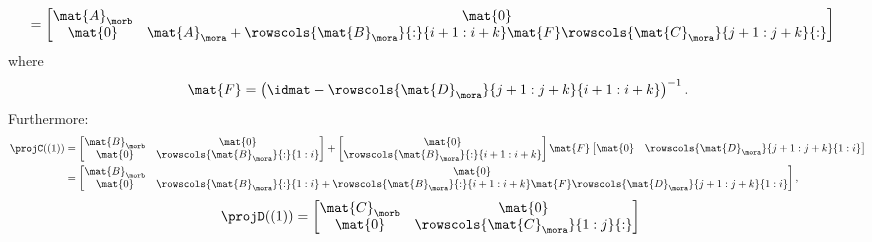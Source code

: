 \begin{example}
\begin{equation*}
\begin{aligned}
                        & =\begin{bmatrix}\mat{A}_\morb & \mat{0}                                                                                         \\
               \mat{0}       & \mat{A}_\mora + \rowscols{\mat{B}_\mora}{:}{i+1:i+k}\mat{F}\rowscols{\mat{C}_\mora}{j+1:j+k}{:}
                           \end{bmatrix}
        \end{aligned}
    \end{equation*}
    where
    \begin{equation*}
        \mat{F}=\left(\idmat - \rowscols{\mat{D}_\mora}{j+1:j+k}{i+1:i+k}\right)^{-1}.
    \end{equation*}
    Furthermore:
    \begin{equation*}
        \begin{aligned}
            \projC((1)) & =\begin{bmatrix} \mat{B}_\morb&\mat{0}\\ \mat{0}&\rowscols{\mat{B}_\mora}{:}{1:i}\end{bmatrix}
            + \begin{bmatrix} \mat{0}\\ \rowscols{\mat{B}_\mora}{:}{i+1:i+k} \end{bmatrix}\mat{F}\begin{bmatrix} \mat{0}&\rowscols{\mat{D}_\mora}{j+1:j+k}{1:i}\end{bmatrix} \\
                        & =\begin{bmatrix}
                               \mat{B}_\morb & \mat{0}                                                                                                             \\
                               \mat{0}       & \rowscols{\mat{B}_\mora}{:}{1:i}+ \rowscols{\mat{B}_\mora}{:}{i+1:i+k}\mat{F}\rowscols{\mat{D}_\mora}{j+1:j+k}{1:i}
                           \end{bmatrix},
        \end{aligned}
    \end{equation*}
    \begin{equation*}
        \begin{aligned}
            \projD((1)) & =\begin{bmatrix} \mat{C}_\morb&\mat{0}\\ \mat{0}&\rowscols{\mat{C}_\mora}{1:j}{:}\end{bmatrix}

\end{aligned}
\end{equation*}
\end{example}
